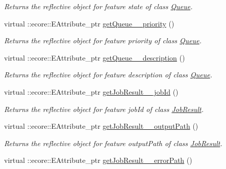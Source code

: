 \begin{DoxyCompactItemize}
\begin{DoxyCompactList}\small\item\em Returns the reflective object for feature state of class \hyperlink{classTMS__Data_1_1Queue}{Queue}. \item\end{DoxyCompactList}\item 
virtual ::ecore::EAttribute\_\-ptr \hyperlink{classTMS__Data_1_1TMS__DataPackage_abd2e43d00134800b9d6d68972d6aca9d}{getQueue\_\-\_\-priority} ()
\begin{DoxyCompactList}\small\item\em Returns the reflective object for feature priority of class \hyperlink{classTMS__Data_1_1Queue}{Queue}. \item\end{DoxyCompactList}\item 
virtual ::ecore::EAttribute\_\-ptr \hyperlink{classTMS__Data_1_1TMS__DataPackage_a3f4d80faea58bb0cb415c4030c3c200d}{getQueue\_\-\_\-description} ()
\begin{DoxyCompactList}\small\item\em Returns the reflective object for feature description of class \hyperlink{classTMS__Data_1_1Queue}{Queue}. \item\end{DoxyCompactList}\item 
virtual ::ecore::EAttribute\_\-ptr \hyperlink{classTMS__Data_1_1TMS__DataPackage_a3fed89482cee5894b8171694ff31f966}{getJobResult\_\-\_\-jobId} ()
\begin{DoxyCompactList}\small\item\em Returns the reflective object for feature jobId of class \hyperlink{classTMS__Data_1_1JobResult}{JobResult}. \item\end{DoxyCompactList}\item 
virtual ::ecore::EAttribute\_\-ptr \hyperlink{classTMS__Data_1_1TMS__DataPackage_ab243fa986fcdfa1232594bc86ad104cf}{getJobResult\_\-\_\-outputPath} ()
\begin{DoxyCompactList}\small\item\em Returns the reflective object for feature outputPath of class \hyperlink{classTMS__Data_1_1JobResult}{JobResult}. \item\end{DoxyCompactList}\item 
virtual ::ecore::EAttribute\_\-ptr \hyperlink{classTMS__Data_1_1TMS__DataPackage_afce77ea2cc235d10bc2acae20306c827}{getJobResult\_\-\_\-errorPath} ()

\end{DoxyCompactItemize}
